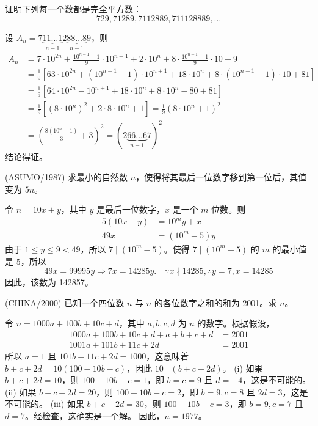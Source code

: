 \begin{questions}
\question 证明下列每一个数都是完全平方数：
\[
729, 71289, 7112889, 711128889, \dots
\]

\begin{solution}
设 $A_n = 7\underbrace{11 \dots 1}_{n-1} 2 \underbrace{88 \dots 8}_{n-1} 9$，则
\begin{align*}
A_n &= 7 \cdot 10^{2n} + \frac{10^{n-1} - 1}{9} \cdot 10^{n+1} + 2 \cdot 10^n + 8 \cdot \frac{10^{n-1} - 1}{9} \cdot 10 + 9 \\
&= \frac{1}{9} \left[ 63 \cdot 10^{2n} + (10^{n-1} - 1) \cdot 10^{n+1} + 18 \cdot 10^n + 8 \cdot (10^{n-1} - 1) \cdot 10 + 81 \right] \\
&= \frac{1}{9} \left[ 64 \cdot 10^{2n} - 10^{n+1} + 18 \cdot 10^n + 8 \cdot 10^n - 80 + 81 \right] \\
&= \frac{1}{9} \left[ (8 \cdot 10^n)^2 + 2 \cdot 8 \cdot 10^n + 1 \right] = \frac{1}{9} (8 \cdot 10^n + 1)^2 \\
&= \left( \frac{8(10^n - 1)}{3} + 3 \right)^2 = (2\underbrace{66 \dots 6}_{n-1} 7)^2
\end{align*}
结论得证。
\end{solution}

\question (ASUMO/1987) 求最小的自然数 $n$，使得将其最后一位数字移到第一位后，其值变为 $5n$。

\begin{solution}
令 $n = 10x + y$，其中 $y$ 是最后一位数字，$x$ 是一个 $m$ 位数。则
\begin{align*}
5(10x + y) &= 10^m y + x \\
49x &= (10^m - 5)y
\end{align*}
由于 $1 \leq y \leq 9 < 49$，所以 $7 \mid (10^m - 5)$。使得 $7 \mid (10^m - 5)$ 的 $m$ 的最小值是 5，所以
\[
49x = 99995y \Rightarrow 7x = 14285y. \quad \because x \nmid 14285, \therefore y = 7, x = 14285
\]
因此，该数为 142857。
\end{solution}

\question (CHINA/2000) 已知一个四位数 $n$ 与 $n$ 的各位数字之和的和为 2001。求 $n$。

\begin{solution}
令 $n = 1000a + 100b + 10c + d$，其中 $a, b, c, d$ 为 $n$ 的数字。根据假设，
\begin{align*}
1000a + 100b + 10c + d + a + b + c + d &= 2001 \\
1001a + 101b + 11c + 2d &= 2001
\end{align*}
所以 $a = 1$ 且 $101b + 11c + 2d = 1000$，这意味着 $b + c + 2d = 10(100 - 10b - c)$，因此 $10 \mid (b + c + 2d)$。
(i) 如果 $b + c + 2d = 10$，则 $100 - 10b - c = 1$，即 $b = c = 9$ 且 $d = -4$，这是不可能的。
(ii) 如果 $b + c + 2d = 20$，则 $100 - 10b - c = 2$，即 $b = 9, c = 8$ 且 $2d = 3$，这是不可能的。
(iii) 如果 $b + c + 2d = 30$，则 $100 - 10b - c = 3$，即 $b = 9, c = 7$ 且 $d = 7$。经检查，这确实是一个解。
因此，$n = 1977$。
\end{solution}


\end{questions}
